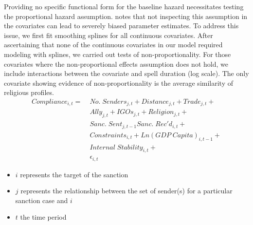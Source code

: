 Providing no specific functional form for the baseline hazard necessitates testing the proportional hazard assumption. \citet{keele2010proportionally} notes that not inspecting this assumption in the covariates can lead to severely biased parameter estimates. To address this issue, we first fit smoothing splines for all continuous covariates. After ascertaining that none of the continuous covariates in our model required modeling with splines, we carried out tests of non-proportionality. For those covariates where the non-proportional effects assumption does not hold, we include interactions between the covariate and spell duration (log scale). The only covariate showing evidence of non-proportionality is the average similarity of religious profiles.
\vspace{.01in}
\begin{align*}
		Compliance_{i,t} =\; & No. \; Senders_{j,t} + Distance_{j,t} + Trade_{j,t}  + \\
		 &Ally_{j,t} + IGOs_{j,t} + Religion_{j,t} +\\
 		 &Sanc. \; Sent_{j,t-1} Sanc. \; Rec'd_{i,t} + \\
		 &Constraints_{i,t} + Ln(GDP \; Capita)_{i,t-1} +\\
		 & Internal \; Stability_{i,t} +\\
		 &\epsilon_{i,t}
	\end{align*}
	
\begin{singlespacing}	
\begin{itemize}
	\item $i$ represents the target of the sanction
	\item $j$ represents the relationship between the set of sender(s) for a particular sanction case and $i$
	\item $t$ the time period
\end{itemize}
\end{singlespacing}

